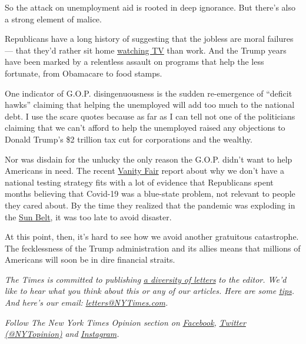 So the attack on unemployment aid is rooted in deep ignorance. But
there's also a strong element of malice.

Republicans have a long history of suggesting that the jobless are moral
failures --- that they'd rather sit home
\href{https://www.epi.org/blog/ugly-views-about-the-unemployed-by-congressional-republicans/}{watching
TV} than work. And the Trump years have been marked by a relentless
assault on programs that help the less fortunate, from Obamacare to food
stamps.

One indicator of G.O.P. disingenuousness is the sudden re-emergence of
``deficit hawks'' claiming that helping the unemployed will add too much
to the national debt. I use the scare quotes because as far as I can
tell not one of the politicians claiming that we can't afford to help
the unemployed raised any objections to Donald Trump's \$2 trillion tax
cut for corporations and the wealthy.

Nor was disdain for the unlucky the only reason the G.O.P. didn't want
to help Americans in need. The recent
\href{https://www.vanityfair.com/news/2020/07/how-jared-kushners-secret-testing-plan-went-poof-into-thin-air}{Vanity
Fair} report about why we don't have a national testing strategy fits
with a lot of evidence that Republicans spent months believing that
Covid-19 was a blue-state problem, not relevant to people they cared
about. By the time they realized that the pandemic was exploding in the
\href{https://covidtracking.com/data/charts/regional-cases}{Sun Belt},
it was too late to avoid disaster.

At this point, then, it's hard to see how we avoid another gratuitous
catastrophe. The fecklessness of the Trump administration and its allies
means that millions of Americans will soon be in dire financial straits.

\emph{The Times is committed to publishing}
\href{https://www.nytimes3xbfgragh.onion/2019/01/31/opinion/letters/letters-to-editor-new-york-times-women.html}{\emph{a
diversity of letters}} \emph{to the editor. We'd like to hear what you
think about this or any of our articles. Here are some}
\href{https://help.nytimes3xbfgragh.onion/hc/en-us/articles/115014925288-How-to-submit-a-letter-to-the-editor}{\emph{tips}}\emph{.
And here's our email:}
\href{mailto:letters@NYTimes.com}{\emph{letters@NYTimes.com}}\emph{.}

\emph{Follow The New York Times Opinion section on}
\href{https://www.facebookcorewwwi.onion/nytopinion}{\emph{Facebook}}\emph{,}
\href{http://twitter.com/NYTOpinion}{\emph{Twitter (@NYTopinion)}}
\emph{and}
\href{https://www.instagram.com/nytopinion/}{\emph{Instagram}}\emph{.}

